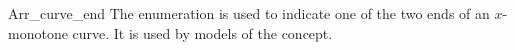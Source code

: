 \begin{ccRefEnum}{Arr_curve_end}
  \ccDefinition
  The enumeration \ccRefName{} is used to indicate one of the two ends
  of an $x$-monotone curve. It is used by models of the
   concept.
  


  \ccSeeAlso
\end{ccRefEnum}
